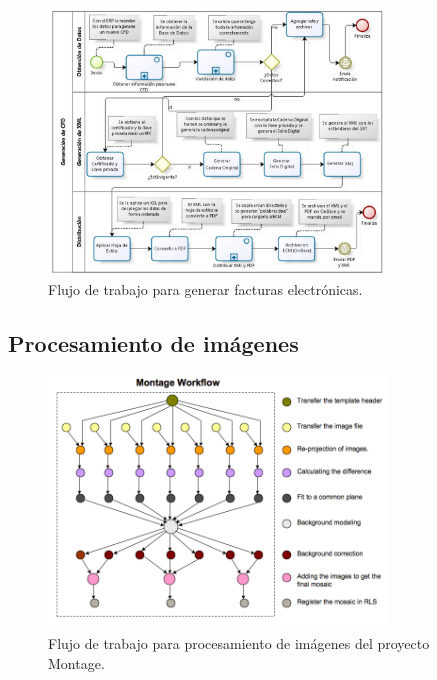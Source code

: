 \begin{figure}
    \begin{center}
        \includegraphics[width=0.8\textwidth]{imagenes/cfd-workflow}
    \end{center}
    \caption{Flujo de trabajo para generar facturas electrónicas.}
    \label{fig:cfd-workflow}
\end{figure}

\subsection{Procesamiento de imágenes}

\begin{figure}
    \begin{center}
        \includegraphics[width=0.8\textwidth]{imagenes/montage-workflow}
    \end{center}
    \caption{Flujo de trabajo para procesamiento de imágenes del proyecto Montage.}
    \label{fig:montage-workflow}
\end{figure}



